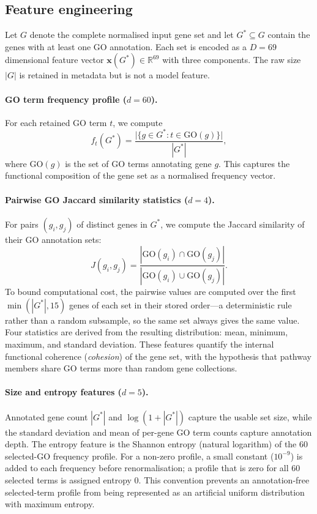 \documentclass[12pt,twoside]{article}
\begin{document}
\subsection{Feature engineering}
\label{sec:features}

Let $G$ denote the complete normalised input gene set and let
$G^* \subseteq G$ contain the genes with at least one GO annotation. Each set is
encoded as a $D = 69$ dimensional feature vector
$\mathbf{x}(G^*) \in \mathbb{R}^{69}$ with three components. The raw size
$|G|$ is retained in metadata but is not a model feature.

\paragraph{GO term frequency profile ($d = 60$).}
For each retained GO term $t$, we compute
\begin{equation}
f_t(G^*) = \frac{\bigl|\{g \in G^* : t \in \mathrm{GO}(g)\}\bigr|}{|G^*|},
\label{eq:go_freq}
\end{equation}
where $\mathrm{GO}(g)$ is the set of GO terms annotating gene $g$.
This captures the functional composition of the gene set as a normalised
frequency vector.

\paragraph{Pairwise GO Jaccard similarity statistics ($d = 4$).}
For pairs $(g_i, g_j)$ of distinct genes in $G^*$, we compute the
Jaccard similarity of their GO annotation sets:
\begin{equation}
J(g_i, g_j) = \frac{|\mathrm{GO}(g_i) \cap \mathrm{GO}(g_j)|}{|\mathrm{GO}(g_i) \cup \mathrm{GO}(g_j)|}.
\label{eq:jaccard}
\end{equation}
To bound computational cost, the pairwise values are computed over the first
$\min(|G^*|, 15)$ genes of each set in their stored order---a deterministic rule
rather than a random subsample, so the same set always gives the same value.
Four statistics are derived from the resulting distribution: mean, minimum,
maximum, and standard deviation.
These features quantify the internal functional coherence (\emph{cohesion})
of the gene set, with the hypothesis that pathway members share GO terms
more than random gene collections.

\paragraph{Size and entropy features ($d = 5$).}
Annotated gene count $|G^*|$ and $\log(1 + |G^*|)$ capture the usable set size, while the standard deviation and mean of per-gene GO term counts capture annotation depth. The entropy feature is the Shannon entropy (natural logarithm) of the 60 selected-GO frequency profile. For a non-zero profile, a small constant ($10^{-9}$) is added to each frequency before renormalisation; a profile that is zero for all 60 selected terms is assigned entropy 0. This convention prevents an annotation-free selected-term profile from being represented as an artificial uniform distribution with maximum entropy.
\end{document}
